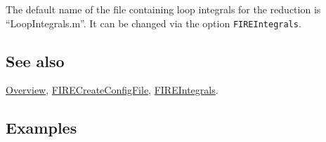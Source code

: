 \documentclass[../FeynHelpersManual.tex]{subfiles}
\begin{document}
The default name of the file containing loop integrals for the reduction
is ``LoopIntegrals.m''. It can be changed via the option
\texttt{FIREIntegrals}.

\subsection{See also}

\hyperlink{toc}{Overview},
\hyperlink{firecreateconfigfile}{FIRECreateConfigFile},
\hyperlink{fireintegrals}{FIREIntegrals}.

\subsection{Examples}

\begin{Shaded}
\begin{Highlighting}[]
\ExtensionTok{=}\SpecialCharTok{\^{}}\SpecialCharTok{*}\OperatorTok{[}\OperatorTok{,} \OperatorTok{\{}\SpecialCharTok{{-}}\OperatorTok{,} \OperatorTok{,} \OperatorTok{,} \OperatorTok{,} \OperatorTok{\}]} \SpecialCharTok{+} 
\SpecialCharTok{\^{}}\SpecialCharTok{*}\OperatorTok{[}\OperatorTok{,} \OperatorTok{\{}\SpecialCharTok{{-}}\OperatorTok{,} \OperatorTok{,} \OperatorTok{,} \OperatorTok{,} \OperatorTok{\}]} \SpecialCharTok{{-}} 
\SpecialCharTok{\^{}}\SpecialCharTok{*}\OperatorTok{[}\OperatorTok{,} \OperatorTok{\{}\SpecialCharTok{{-}}\OperatorTok{,} \OperatorTok{,} \OperatorTok{,} \OperatorTok{,} \OperatorTok{\}]} \SpecialCharTok{{-}} 
\SpecialCharTok{\^{}}\SpecialCharTok{*}\SpecialCharTok{\^{}}\SpecialCharTok{*}\OperatorTok{[}\OperatorTok{,} \OperatorTok{\{}\SpecialCharTok{{-}}\OperatorTok{,} \OperatorTok{,} \OperatorTok{,} \OperatorTok{,} \OperatorTok{\}]} \SpecialCharTok{+} 
\SpecialCharTok{\^{}}\SpecialCharTok{*}\OperatorTok{[}\OperatorTok{,} \OperatorTok{\{}\SpecialCharTok{{-}}\OperatorTok{,} \SpecialCharTok{{-}}\OperatorTok{,} \OperatorTok{,} \OperatorTok{,} \OperatorTok{\}]} \SpecialCharTok{{-}} 

\end{Highlighting}
\end{Shaded}
\end{document}
